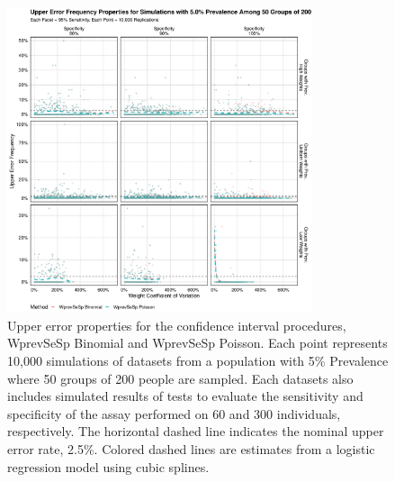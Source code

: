 \documentclass[AMA,STIX1COL]{WileyNJD-v2}
\begin{document}
\begin{figure}
\centering
\includegraphics[width=0.8\textwidth]{figures/imperfect_upper_error_frequency_50_groups_0_05_prev.pdf}
\caption{Upper error properties for the confidence interval procedures, WprevSeSp Binomial and WprevSeSp Poisson.
Each point represents 10,000 simulations of datasets from a population with 5\% Prevalence where 50 groups of 200 people are sampled.
Each datasets also includes simulated results of tests to evaluate the sensitivity and specificity of the assay performed on 60 and 300 individuals, respectively.
The horizontal dashed line indicates the nominal upper error rate, 2.5\%.
Colored dashed lines are estimates from a logistic regression model using cubic splines.}
\label{fig:imperfect_upper_error_frequency_50_groups_0_05_prev}
\end{figure}
\end{document}
